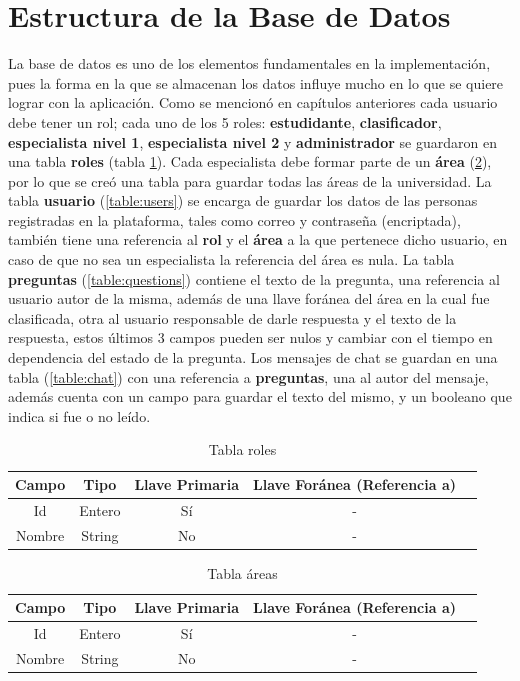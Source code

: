\section{Estructura de la Base de Datos}
La base de datos es uno de los elementos fundamentales en la implementación, pues la forma en la que se almacenan los datos influye mucho en lo que se quiere lograr con la aplicación. Como se mencionó en capítulos anteriores cada usuario debe tener un rol; cada uno de los 5 roles: \textbf{estudidante}, \textbf{clasificador}, \textbf{especialista nivel 1}, \textbf{especialista nivel 2} y \textbf{administrador} se guardaron en una tabla \textbf{roles} (tabla \ref{table:roles}). Cada especialista debe formar parte de un \textbf{área} (\ref{table:areas}), por lo que se creó una tabla para guardar todas las áreas de la universidad. La tabla \textbf{usuario} (\ref{table:users})  se encarga de guardar los datos de las personas registradas en la plataforma, tales como correo y contraseña (encriptada), también tiene una referencia al \textbf{rol} y el \textbf{área} a la que pertenece dicho usuario, en caso de que no sea un especialista la referencia del área es nula. La tabla \textbf{preguntas} (\ref{table:questions}) contiene el texto de la pregunta, una referencia al usuario autor de la misma, además de una llave foránea del área en la cual fue clasificada, otra al usuario responsable de darle respuesta y el texto de la respuesta, estos últimos 3 campos pueden ser nulos y cambiar con el tiempo en dependencia del estado de la pregunta. Los mensajes de chat se guardan en una tabla (\ref{table:chat}) con una referencia a \textbf{preguntas}, una al autor del mensaje, además cuenta con un campo para guardar el texto del mismo, y un booleano que indica si fue o no leído.

\begin{table}[h]
	\begin{tabular}{| c | c | c | c | c |}
		\hline
		Campo & Tipo & Llave Primaria & Llave Foránea (Referencia a) \\ \hline
		Id & Entero & Sí & -  \\ \hline 
		Nombre & String & No & - \\ \hline
	\end{tabular}
	\caption{Tabla roles}
	\label{table:roles}
\end{table}


\begin{table}[h]
	\begin{tabular}{| c | c | c | c | c |}
		\hline
		Campo & Tipo & Llave Primaria & Llave Foránea (Referencia a) \\ \hline
		Id & Entero & Sí & -  \\ \hline 
		Nombre & String & No & - \\ \hline
	\end{tabular}
	\caption{Tabla áreas}
	\label{table:areas}
\end{table}

